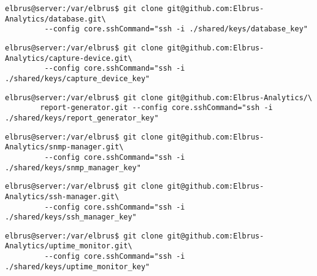 \documentclass{article}
\begin{document}
	\lstset{style=commands}
	\begin{lstlisting}[caption={Clonen der Datenbank Software.}]
		elbrus@server:/var/elbrus$ git clone git@github.com:Elbrus-Analytics/database.git\
		 --config core.sshCommand="ssh -i ./shared/keys/database_key"
	\end{lstlisting}
	
	\lstset{style=commands}
	\begin{lstlisting}[caption={Clonen der 'Capture-Device' Software.}]
		elbrus@server:/var/elbrus$ git clone git@github.com:Elbrus-Analytics/capture-device.git\
		 --config core.sshCommand="ssh -i ./shared/keys/capture_device_key"
	\end{lstlisting}
	

	\lstset{style=commands}
	\begin{lstlisting}[caption={Clonen der 'Report-Generator' Software.}]
		elbrus@server:/var/elbrus$ git clone git@github.com:Elbrus-Analytics/\
		report-generator.git --config core.sshCommand="ssh -i ./shared/keys/report_generator_key"
	\end{lstlisting}
	
	\lstset{style=commands}
	\begin{lstlisting}[caption={Clonen der 'SNMP-Manager' Software.}]
		elbrus@server:/var/elbrus$ git clone git@github.com:Elbrus-Analytics/snmp-manager.git\
		 --config core.sshCommand="ssh -i ./shared/keys/snmp_manager_key"
	\end{lstlisting}

	\lstset{style=commands}
	\begin{lstlisting}[caption={Clonen der 'SSH-Manager' Software.}]
		elbrus@server:/var/elbrus$ git clone git@github.com:Elbrus-Analytics/ssh-manager.git\
		 --config core.sshCommand="ssh -i ./shared/keys/ssh_manager_key"
	\end{lstlisting}
	
	\lstset{style=commands}
	\begin{lstlisting}[caption={Clonen der 'Uptime-Monitor' Software.}]
		elbrus@server:/var/elbrus$ git clone git@github.com:Elbrus-Analytics/uptime_monitor.git\
		 --config core.sshCommand="ssh -i ./shared/keys/uptime_monitor_key"
	\end{lstlisting}
\end{document}
